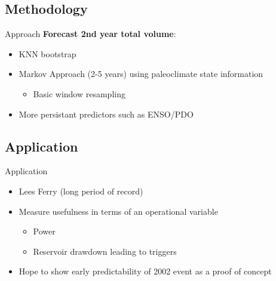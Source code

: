 \documentclass[xcolor=x11names,compress]{beamer}
\renewcommand{\(}{\begin{columns}}
\renewcommand{\)}{\end{columns}}
\newcommand{\<}[1]{\begin{column}{#1}}
\renewcommand{\>}{\end{column}}
\begin{document}
\subsection{Methodology}
\begin{frame}{Approach}
\textbf{Forecast 2nd year total volume}:
	\begin{itemize}
	\item KNN bootstrap
	\pause
	\item Markov Approach (2-5 years) using paleoclimate state information
	\begin{itemize}
		\item Basic window resampling
	\end{itemize}
	\item More persistant predictors such as ENSO/PDO
	\end{itemize}
\end{frame}


\subsection{Application}
\begin{frame}{Application}
\begin{itemize}
\item Lees Ferry (long period of record)
\pause
\item Measure usefulness in terms of an operational variable
	\begin{itemize}
		\item Power
		\item Reservoir drawdown leading to triggers
	\end{itemize}
\pause
\item Hope to show early predictability of 2002 event as a proof of concept
\end{itemize}
\end{frame}
\end{document}
